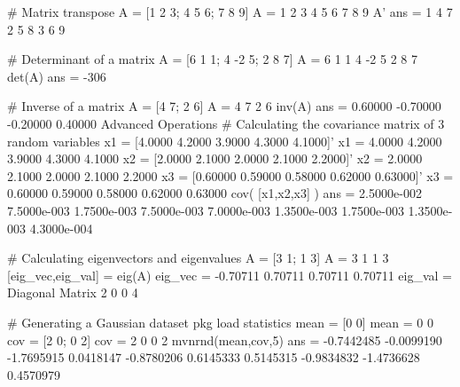 # Matrix transpose
A = [1 2 3; 4 5 6; 7 8 9]
A =
   1   2   3
   4   5   6
   7   8   9
A'
ans =
   1   4   7
   2   5   8
   3   6   9

# Determinant of a matrix
A = [6 1 1; 4 -2 5; 2 8 7]
A =
   6   1   1
   4  -2   5
   2   8   7
det(A)
ans = -306

# Inverse of a matrix
A = [4 7; 2 6]
A =
   4   7
   2   6
inv(A)
ans =
   0.60000  -0.70000
  -0.20000   0.40000
Advanced Operations
# Calculating the covariance matrix of 3 random variables
x1 = [4.0000 4.2000 3.9000 4.3000 4.1000]'
x1 =
   4.0000
   4.2000
   3.9000
   4.3000
   4.1000
x2 = [2.0000 2.1000 2.0000 2.1000 2.2000]'
x2 =
   2.0000
   2.1000
   2.0000
   2.1000
   2.2000
x3 = [0.60000 0.59000 0.58000 0.62000 0.63000]'
x3 =
   0.60000
   0.59000
   0.58000
   0.62000
   0.63000
cov( [x1,x2,x3] )
ans =
  2.5000e-002  7.5000e-003  1.7500e-003
  7.5000e-003  7.0000e-003  1.3500e-003
  1.7500e-003  1.3500e-003  4.3000e-004

# Calculating eigenvectors and eigenvalues
A = [3 1; 1 3]
A =
   3   1
   1   3
[eig_vec,eig_val] = eig(A)
eig_vec =
  -0.70711   0.70711
   0.70711   0.70711
eig_val =
Diagonal Matrix
   2   0
   0   4

# Generating a Gaussian dataset
pkg load statistics
mean = [0 0]
mean =
   0   0
cov = [2 0; 0 2]
cov =
   2   0
   0   2
mvnrnd(mean,cov,5)
ans =
  -0.7442485  -0.0099190
  -1.7695915   0.0418147
  -0.8780206   0.6145333
   0.5145315  -0.9834832
  -1.4736628   0.4570979
